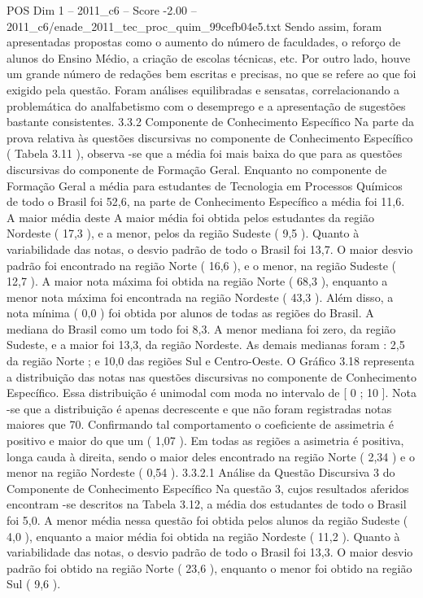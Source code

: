 \begin{textsample}{POS Dim 1 – 2011\_c6 – Score -2.00 – 2011\_c6/enade\_2011\_tec\_proc\_quim\_99cefb04e5.txt}
Sendo assim, foram apresentadas propostas como o aumento do número de faculdades, o reforço de alunos do Ensino Médio, a criação de escolas técnicas, etc.
Por outro lado, houve um grande número de redações bem escritas e precisas, no que se refere ao que foi exigido pela questão.
Foram análises equilibradas e sensatas, correlacionando a problemática do analfabetismo com o desemprego e a apresentação de sugestões bastante consistentes. 3.3.2 Componente de Conhecimento Específico Na parte da prova relativa às questões discursivas no componente de Conhecimento Específico ( Tabela 3.11 ), observa -se que a média foi mais baixa do que para as questões discursivas do componente de Formação Geral.
Enquanto no componente de Formação Geral a média para estudantes de Tecnologia em Processos Químicos de todo o Brasil foi 52,6, na parte de Conhecimento Específico a média foi 11,6.
A maior média deste A maior média foi obtida pelos estudantes da região Nordeste ( 17,3 ), e a menor, pelos da região Sudeste ( 9,5 ).
Quanto à variabilidade das notas, o desvio padrão de todo o Brasil foi 13,7.
O maior desvio padrão foi encontrado na região Norte ( 16,6 ), e o menor, na região Sudeste ( 12,7 ).
A maior nota máxima foi obtida na região Norte ( 68,3 ), enquanto a menor nota máxima foi encontrada na região Nordeste ( 43,3 ).
Além disso, a nota mínima ( 0,0 ) foi obtida por alunos de todas as regiões do Brasil.
A mediana do Brasil como um todo foi 8,3.
A menor mediana foi zero, da região Sudeste, e a maior foi 13,3, da região Nordeste.
As demais medianas foram : 2,5 da região Norte ; e 10,0 das regiões Sul e Centro-Oeste.
O Gráfico 3.18 representa a distribuição das notas nas questões discursivas no componente de Conhecimento Específico.
Essa distribuição é unimodal com moda no intervalo de [ 0 ; 10 ].
Nota -se que a distribuição é apenas decrescente e que não foram registradas notas maiores que 70.
Confirmando tal comportamento o coeficiente de assimetria é positivo e maior do que um ( 1,07 ).
Em todas as regiões a asimetria é positiva, longa cauda à direita, sendo o maior deles encontrado na região Norte ( 2,34 ) e o menor na região Nordeste ( 0,54 ). 3.3.2.1 Análise da Questão Discursiva 3 do Componente de Conhecimento Específico Na questão 3, cujos resultados aferidos encontram -se descritos na Tabela 3.12, a média dos estudantes de todo o Brasil foi 5,0.
A menor média nessa questão foi obtida pelos alunos da região Sudeste ( 4,0 ), enquanto a maior média foi obtida na região Nordeste ( 11,2 ).
Quanto à variabilidade das notas, o desvio padrão de todo o Brasil foi 13,3.
O maior desvio padrão foi obtido na região Norte ( 23,6 ), enquanto o menor foi obtido na região Sul ( 9,6 ).

\end{textsample}
